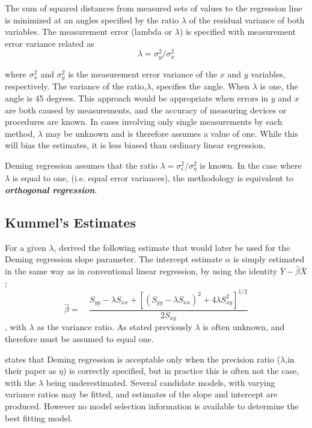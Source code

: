 \documentclass[12pt, a4paper]{report}
\theoremstyle{plain}
\theoremstyle{definition}
\theoremstyle{remark}
\begin{document}
The sum of squared distances from measured sets of values to the regression line is minimized at an angles specified by the ratio $\lambda$ of the residual variance of both variables. The measurement error (lambda or $\lambda$) is specified with measurement error variance related as 
	\[\lambda = \sigma^2_y/\sigma^2_x\]
	
where $\sigma^2_x$ and $\sigma^2_y$ is the measurement error variance of the $x$ and $y$ variables, respectively.
The variance of the ratio,$\lambda$, specifies the angle.  When $\lambda$ is one, the angle is 45 degrees. 
This approach would be appropriate when errors in $y$ and $x$ are both caused by measurements, and the accuracy of measuring devices or procedures are known. In cases involving only single measurements by each method, $\lambda$ may be unknown and is therefore assumes a value of one. While this will bias the estimates, it is less biased than ordinary linear regression.

Deming regression assumes that the ratio $\lambda = \sigma^2_{\epsilon}/\sigma^2_{\eta}$ is known. In the case where $\lambda$ is equal to one, (i.e. equal error variances), the methodology is equivalent to \textit{\textbf{orthogonal regression}}.
\subsection{Kummel's Estimates}


For a given $\lambda$, \citet{Kummel} derived the following estimate that would later be used for the Deming regression slope
parameter. The intercept estimate $\alpha$ is simply estimated in the same way as in conventional linear
regression, by using the identity $\bar{Y}-\hat{\beta}\bar{X}$;
\begin{equation}
\hat{\beta} =\quad \frac{S_{yy} - \lambda S_{xx}+[(S_{yy} -
	\lambda S_{xx})^{2}+ 4\lambda S^{2}_{xy}]^{1/2}}{2S_{xy}}
\end{equation},
with $\lambda$ as the variance ratio. As stated previously $\lambda$ is often unknown, and therefore must be assumed to equal one. 

\citet{CarollRupert} states that Deming
regression is acceptable only when the precision ratio ($\lambda$,in their paper as $\eta$) is correctly specified, but in practice this is often not the case, with the $\lambda$ being underestimated. Several candidate models, with varying variance ratios may be fitted, and estimates of the slope and intercept are produced. However no model selection information is available to determine the best fitting model.
\end{document}
